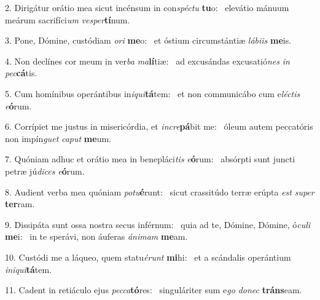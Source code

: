 2. Dirigátur orátio mea sicut incénsum in con\textit{spéc}\textit{tu} \textbf{tu}o: \ast\  elevátio mánuum meárum sacrifíci\textit{um} \textit{ves}\textit{per}\textbf{tí}num.\

3. Pone, Dómine, custódiam \textit{o}\textit{ri} \textbf{me}o: \ast\  et óstium circumstántiæ \textit{lá}\textit{bi}\textit{is} \textbf{me}is.\

4. Non declínes cor meum in ver\textit{ba} \textit{ma}\textbf{lí}tiæ: \ast\  ad excusándas excusatió\textit{nes} \textit{in} \textit{pec}\textbf{cá}tis.\

5. Cum homínibus operántibus in\textit{i}\textit{qui}\textbf{tá}tem: \ast\  et non communicábo cum e\textit{léc}\textit{tis} \textit{e}\textbf{ó}rum.\

6. Corrípiet me justus in misericórdia, et \textit{in}\textit{cre}\textbf{pá}bit me: \ast\  óleum autem peccatóris non impín\textit{guet} \textit{ca}\textit{put} \textbf{me}um.\

7. Quóniam adhuc et orátio mea in benepláci\textit{tis} \textit{e}\textbf{ó}rum: \ast\  absórpti sunt juncti petræ jú\textit{di}\textit{ces} \textit{e}\textbf{ó}rum.\

8. Audient verba mea quóniam \textit{pot}\textit{u}\textbf{é}runt: \ast\  sicut crassitúdo terræ erúpta \textit{est} \textit{su}\textit{per} \textbf{ter}ram.\

9. Dissipáta sunt ossa nostra secus inférnum: \dag\  quia ad te, Dómine, Dómine, ó\textit{cu}\textit{li} \textbf{me}i: \ast\  in te sperávi, non áuferas \textit{á}\textit{ni}\textit{mam} \textbf{me}am.\

10. Custódi me a láqueo, quem statu\textit{é}\textit{runt} \textbf{mi}hi: \ast\  et a scándalis operántium \textit{in}\textit{i}\textit{qui}\textbf{tá}tem.\

11. Cadent in retiáculo ejus \textit{pec}\textit{ca}\textbf{tó}res: \ast\  singuláriter sum e\textit{go} \textit{do}\textit{nec} \textbf{tráns}eam.\

